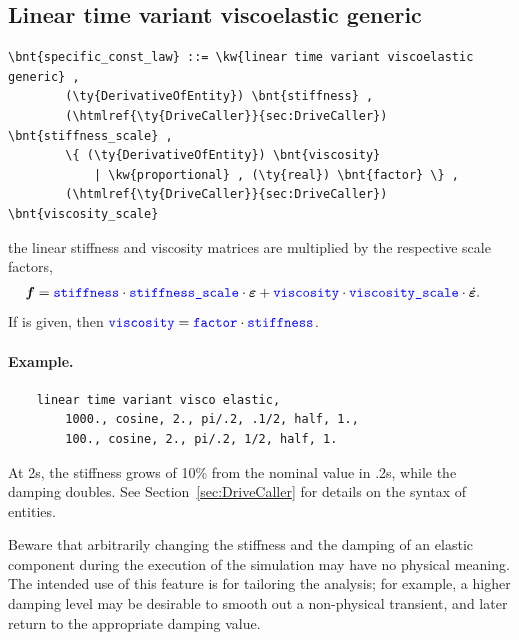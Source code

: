 \subsection{Linear time variant viscoelastic generic}
\begin{Verbatim}[commandchars=\\\{\}]
    \bnt{specific_const_law} ::= \kw{linear time variant viscoelastic generic} ,
        (\ty{DerivativeOfEntity}) \bnt{stiffness} ,
        (\htmlref{\ty{DriveCaller}}{sec:DriveCaller}) \bnt{stiffness_scale} ,
        \{ (\ty{DerivativeOfEntity}) \bnt{viscosity}
            | \kw{proportional} , (\ty{real}) \bnt{factor} \} ,
        (\htmlref{\ty{DriveCaller}}{sec:DriveCaller}) \bnt{viscosity_scale}
\end{Verbatim}
the linear stiffness and viscosity matrices are multiplied
by the respective scale factors,
\begin{align}
	\boldsymbol{f} &= \textcolor{blue}{\texttt{stiffness}} \cdot \textcolor{blue}{\texttt{stiffness\_scale}} \cdot \boldsymbol{\varepsilon}
		+ \textcolor{blue}{\texttt{viscosity}} \cdot \textcolor{blue}{\texttt{viscosity\_scale}} \cdot \dot{\boldsymbol{\varepsilon}}
	.
\end{align}
If  is given, then
$\textcolor{blue}{\texttt{viscosity}} = \textcolor{blue}{\texttt{factor}} \cdot \textcolor{blue}{\texttt{stiffness}}$.

\paragraph{Example.}
\begin{verbatim}
    linear time variant visco elastic,
        1000., cosine, 2., pi/.2, .1/2, half, 1.,
        100., cosine, 2., pi/.2, 1/2, half, 1.
\end{verbatim}
At 2s, the stiffness grows of 10\% from the nominal value in .2s,
while the damping doubles.
See Section~\ref{sec:DriveCaller} for details on the syntax
of  entities.

Beware that arbitrarily changing the stiffness
and the damping of an elastic component during the execution
of the simulation may have no physical meaning.
The intended use of this feature is for tailoring the analysis;
for example, a higher damping level may be desirable to smooth out
a non-physical transient, and later return to the appropriate damping value.
  
